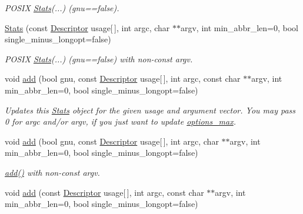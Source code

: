 \begin{DoxyCompactItemize}
\begin{DoxyCompactList}\small\item\em \-P\-O\-S\-I\-X \hyperlink{structoption_1_1_stats}{\-Stats}(...) (gnu==false). \end{DoxyCompactList}\item 
\hypertarget{structoption_1_1_stats_a9b8b4f275efaac6a509df75179929c70}{\hyperlink{structoption_1_1_stats_a9b8b4f275efaac6a509df75179929c70}{\-Stats} (const \hyperlink{structoption_1_1_descriptor}{\-Descriptor} usage\mbox{[}$\,$\mbox{]}, int argc, char $\ast$$\ast$argv, int min\-\_\-abbr\-\_\-len=0, bool single\-\_\-minus\-\_\-longopt=false)}\label{structoption_1_1_stats_a9b8b4f275efaac6a509df75179929c70}

\begin{DoxyCompactList}\small\item\em \-P\-O\-S\-I\-X \hyperlink{structoption_1_1_stats}{\-Stats}(...) (gnu==false) with non-\/const argv. \end{DoxyCompactList}\item 
void \hyperlink{structoption_1_1_stats_aa77e2a8b1704527d2d087820f4456143}{add} (bool gnu, const \hyperlink{structoption_1_1_descriptor}{\-Descriptor} usage\mbox{[}$\,$\mbox{]}, int argc, const char $\ast$$\ast$argv, int min\-\_\-abbr\-\_\-len=0, bool single\-\_\-minus\-\_\-longopt=false)
\begin{DoxyCompactList}\small\item\em \-Updates this \hyperlink{structoption_1_1_stats}{\-Stats} object for the given {\ttfamily usage} and argument vector. \-You may pass 0 for {\ttfamily argc} and/or {\ttfamily argv}, if you just want to update \hyperlink{structoption_1_1_stats_a8121787feb1c7db84fca3ccb012b0473}{options\-\_\-max}. \end{DoxyCompactList}\item 
\hypertarget{structoption_1_1_stats_a2aa7bc64a85dcd9c59576f6a11c2b747}{void \hyperlink{structoption_1_1_stats_a2aa7bc64a85dcd9c59576f6a11c2b747}{add} (bool gnu, const \hyperlink{structoption_1_1_descriptor}{\-Descriptor} usage\mbox{[}$\,$\mbox{]}, int argc, char $\ast$$\ast$argv, int min\-\_\-abbr\-\_\-len=0, bool single\-\_\-minus\-\_\-longopt=false)}\label{structoption_1_1_stats_a2aa7bc64a85dcd9c59576f6a11c2b747}

\begin{DoxyCompactList}\small\item\em \hyperlink{structoption_1_1_stats_aa77e2a8b1704527d2d087820f4456143}{add()} with non-\/const argv. \end{DoxyCompactList}\item 
\hypertarget{structoption_1_1_stats_a4fc47be5db7f52016e3142a9b9dd0d1e}{void \hyperlink{structoption_1_1_stats_a4fc47be5db7f52016e3142a9b9dd0d1e}{add} (const \hyperlink{structoption_1_1_descriptor}{\-Descriptor} usage\mbox{[}$\,$\mbox{]}, int argc, const char $\ast$$\ast$argv, int min\-\_\-abbr\-\_\-len=0, bool single\-\_\-minus\-\_\-longopt=false)}\label{structoption_1_1_stats_a4fc47be5db7f52016e3142a9b9dd0d1e}


\end{DoxyCompactItemize}
